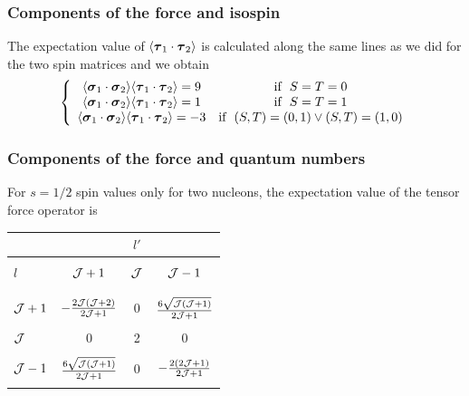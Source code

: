 \documentclass[compress]{beamer}
\begin{document}
{
\frametitle{Components of the force and isospin}
\begin{small}
{\scriptsize
The expectation value of 
$\langle \mbox{\boldmath $\tau$}_1\cdot\mbox{\boldmath $\tau$}_2\rangle$ is calculated along the same lines as we did for
the two spin matrices and we obtain
\[
\left\{ \begin{array}{cc} \langle\mbox{\boldmath $\sigma$}_1\cdot\mbox{\boldmath $\sigma$}_2\rangle\langle\mbox{\boldmath $\tau$}_1\cdot\mbox{\boldmath $\tau$}_2\rangle=9 &  \mathrm{if} \hspace{0.2cm} S=T=0\\
\langle\mbox{\boldmath $\sigma$}_1\cdot\mbox{\boldmath $\sigma$}_2\rangle\langle\mbox{\boldmath $\tau$}_1\cdot\mbox{\boldmath $\tau$}_2\rangle=1 & \mathrm{if} \hspace{0.2cm} S=T=1 \\
\langle\mbox{\boldmath $\sigma$}_1\cdot\mbox{\boldmath $\sigma$}_2\rangle\langle\mbox{\boldmath $\tau$}_1\cdot\mbox{\boldmath $\tau$}_2\rangle=-3 & \mathrm{if} \hspace{0.2cm} (S,T)=(0,1) \vee (S,T)=(1,0)
\end{array}\right.
\]
}
\end{small}
}

\frame
{
\frametitle{Components of the force and quantum numbers}
 For $s=1/2$ spin values only for two nucleons, the expectation value of the tensor force operator is 
\begin{center}
\begin{tabular}{lccc} 
& & $l'$  &  \\ \hline
 & & & \\ 
$l$  & ${\cal J}+1$    & ${\cal J}$  & ${\cal J}-1$  \\ & & & \\  \hline 
& & & \\ 
${\cal J}+1$ & $-\frac{2{\cal J}({\cal J}+2)}{2{\cal J}+1}$  &0  &$\frac{6\sqrt{{\cal J}({\cal J}+1)}}{2{\cal J}+1}$   \\ 
& & & \\ 
${\cal J}$&  0      &2      &    0     \\ 
& & & \\ 
${\cal J}-1$& $\frac{6\sqrt{{\cal J}({\cal J}+1)}}{2{\cal J}+1}$       & 0     & $-\frac{2(2{\cal J}+1)}{2{\cal J}+1}$        \\
& & & \\ \hline 
\end{tabular}
\end{center}
} 
\end{document}
